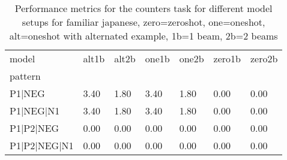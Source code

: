 \begin{table}[h]
\begin{tabular}{l|llllll}
\toprule
model & alt1b & alt2b & one1b & one2b & zero1b & zero2b \\
pattern &  &  &  &  &  &  \\
\midrule
P1|NEG & 3.40 & 1.80 & 3.40 & 1.80 & 0.00 & 0.00 \\
P1|NEG|N1 & 3.40 & 1.80 & 3.40 & 1.80 & 0.00 & 0.00 \\
P1|P2|NEG & 0.00 & 0.00 & 0.00 & 0.00 & 0.00 & 0.00 \\
P1|P2|NEG|N1 & 0.00 & 0.00 & 0.00 & 0.00 & 0.00 & 0.00 \\
\bottomrule
\end{tabular}
\caption{Performance metrics for the counters task for different model setups for familiar japanese, zero=zeroshot, one=oneshot, alt=oneshot with alternated example, 1b=1 beam, 2b=2 beams}
\label{tab:ja fam_counters_performance}
\end{table}
